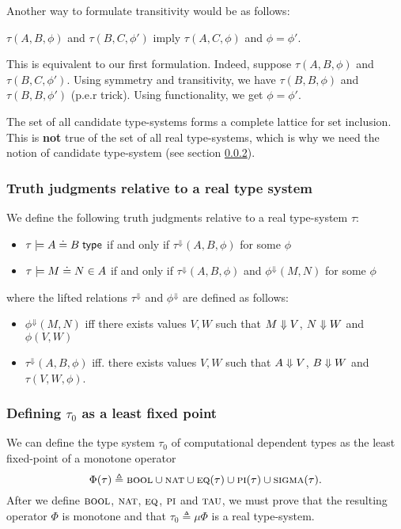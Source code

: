\documentclass{article} \usepackage{chtt-notes} \usepackage{stmaryrd}
\newcommand{\lift}[1]{{#1}^{\Downarrow}}
\begin{document}
\medskip

\begin{remark*}
  Another way to formulate transitivity would be as follows:
  \begin{center}
    $\tau(A, B, \phi)$ and $\tau(B, C, \phi')$ imply
    $\tau(A, C, \phi)$ and $\phi = \phi'$.
  \end{center}
  This is equivalent to our first formulation.  Indeed, suppose
  $\tau(A, B, \phi)$ and $\tau(B, C, \phi')$. Using symmetry and
  transitivity, we have $\tau(B, B, \phi)$ and $\tau(B, B, \phi')$
  (p.e.r trick).  Using functionality, we get $\phi = \phi'$.
\end{remark*}

The set of all candidate type-systems forms a complete lattice for set
inclusion. This is \textbf{not} true of the set of all real
type-systems, which is why we need the notion of candidate type-system
(see section \ref{subsub:tau0}).


\subsubsection{Truth judgments relative to a real type system}

We define the following truth judgments relative to a real type-system
$\tau$:
\begin{itemize}
\item $\tau \models \hasTEC{A}{B}$ if and only if
  $\lift{\tau}(A, B, \phi)$ for some $\phi$
\item $\tau \models \hasEEC{M}{N}{A}$ if and only if
  $\lift{\tau}(A, B, \phi)$ and $\lift{\phi}(M, N)$ for some $\phi$
\end{itemize}
where the lifted relations $\lift{\tau}$ and $\lift{\phi}$ are defined
as follows:
\begin{itemize}
\item $\lift{\phi}(M, N)$ iff there exists values $V, W$ such that
  $M \mathrel{\Downarrow} V$, $N \mathrel{\Downarrow} W$ and $\phi(V, W)$
\item $\lift{\tau}(A, B, \phi)$ iff.  there exists values $V, W$ such
  that $A \mathrel{\Downarrow} V$, $B \mathrel{\Downarrow} W$ and $\tau(V, W, \phi)$.
\end{itemize}

\subsubsection{Defining $\tau_0$ as a least fixed
  point}\label{subsub:tau0}

We can define the type system $\tau_0$ of computational dependent
types as the least fixed-point of a monotone operator
\[ \Phi(\tau) \triangleq \textsc{bool} \cup \textsc{nat} \cup
  \textsc{eq}(\tau) \cup \textsc{pi}(\tau) \cup
  \textsc{sigma}(\tau).  \] After we define $\textsc{bool}$,
$\textsc{nat}$, $\textsc{eq}$, $\textsc{pi}$ and $\textsc{tau}$, we
must prove that the resulting operator $\Phi$ is monotone and that
$\tau_0 \triangleq \mu \Phi$ is a real type-system.
\end{document}
